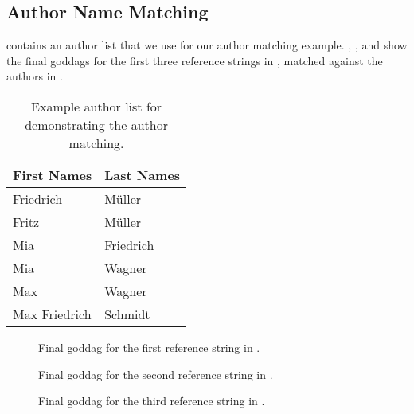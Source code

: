 \subsection{Author Name Matching}\label{app:author-name-matching}
 contains an author list that we use for our author matching example.
, , and  show the final \glspl{goddag} for the first three reference strings in , matched against the authors in .
\begin{table}[h]
\centering
\begin{tabular}{l l}
 \toprule
 First Names & Last Names\\
 \midrule
 Friedrich & M\"{u}ller\\
 Fritz & M\"{u}ller\\
 Mia & Friedrich\\
 Mia & Wagner\\
 Max & Wagner\\
 Max Friedrich & Schmidt\\
 \bottomrule
\end{tabular}
\caption{Example author list for demonstrating the author matching.}
\label{tab:example-author-list}
\end{table}
\begin{figure}[h]
  \centering
  
\caption{Final \gls{goddag} for the first reference string in .}
\label{fig:example-goddag-1-final}
\end{figure}
\begin{figure}[h]
  \centering
  
\caption{Final \gls{goddag} for the second reference string in .}
\label{fig:example-goddag-2-final}
\end{figure}
\begin{figure}[h]
  \centering
  
\caption{Final \gls{goddag} for the third reference string in .}
\label{fig:example-goddag-3-final}
\end{figure}

